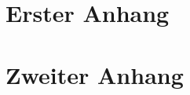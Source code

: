 \cleardoublepage
\appendix

\chapter{Erster Anhang}
\renewcommand{\thepage}{\thechapter-\arabic{page}}

\chapter{Zweiter Anhang}
\renewcommand{\thepage}{\thechapter-\arabic{page}}
